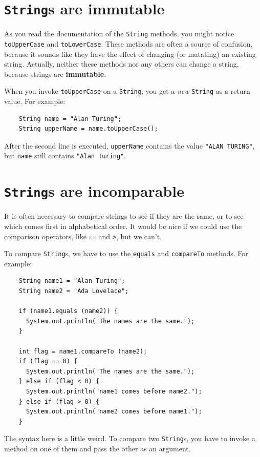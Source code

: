 \documentclass[12pt]{book}
\theoremstyle{exercise}
\begin{document}


\section{{\tt String}s are immutable}
\label{immutable}

As you read the documentation of the {\tt String} methods, you
might notice {\tt toUpperCase} and {\tt toLowerCase}.  These
methods are often a source of confusion, because it sounds
like they have the effect of changing (or mutating) an
existing string.  Actually, neither these methods nor any
others can change a string, because strings are {\bf immutable}.

When you invoke {\tt toUpperCase} on a {\tt String}, you get a
{\em new} {\tt String} as a return value.  For example:

\begin{lstlisting}
    String name = "Alan Turing";
    String upperName = name.toUpperCase();
\end{lstlisting}
%
After the second line is executed, {\tt upperName} contains
the value {\tt "ALAN TURING"}, but {\tt name} still contains
{\tt "Alan Turing"}.


\section{{\tt String}s are incomparable}
\label{incomparable}

It is often necessary to compare strings to see if they are the same,
or to see which comes first in alphabetical order.  It would be
nice if we could use the comparison operators, like {\tt ==} and
{\tt >}, but we can't.

To compare {\tt String}s, we have to use the {\tt equals}
and {\tt compareTo} methods.  For example:

\begin{lstlisting}
    String name1 = "Alan Turing";
    String name2 = "Ada Lovelace";

    if (name1.equals (name2)) {
      System.out.println("The names are the same.");
    }

    int flag = name1.compareTo (name2);
    if (flag == 0) {
      System.out.println("The names are the same.");
    } else if (flag < 0) {
      System.out.println("name1 comes before name2.");
    } else if (flag > 0) {
      System.out.println("name2 comes before name1.");
    }
\end{lstlisting}
%
The syntax here is a little weird.  To compare two {\tt String}s,
you have to invoke a method on one of them and pass the other as an
argument.
\end{document}
